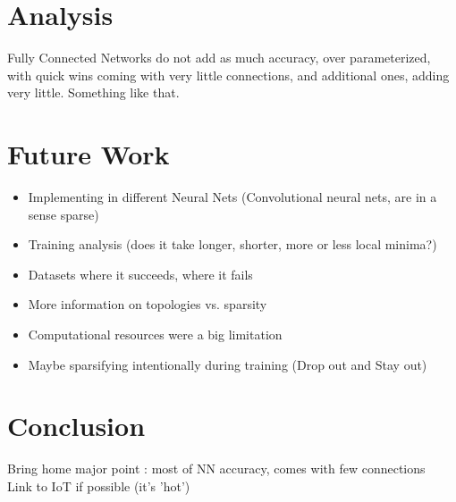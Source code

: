 \documentclass{article}
\begin{document}
\section{Analysis}
Fully Connected Networks do not add as much accuracy, over parameterized, with quick wins coming with very little connections, and additional ones, adding very little. Something like that.

\section{Future Work}
\begin{itemize}
\item Implementing in different Neural Nets (Convolutional neural nets, are in a sense sparse)
\item Training analysis (does it take longer, shorter, more or less local minima?)
\item Datasets where it succeeds, where it fails
\item More information on topologies vs. sparsity
\item Computational resources were a big limitation
\item Maybe sparsifying intentionally during training (Drop out and Stay out)
\end{itemize}

\section{Conclusion}
Bring home major point : most of NN accuracy, comes with few connections\\
Link to IoT if possible (it's 'hot')





\end{document}
